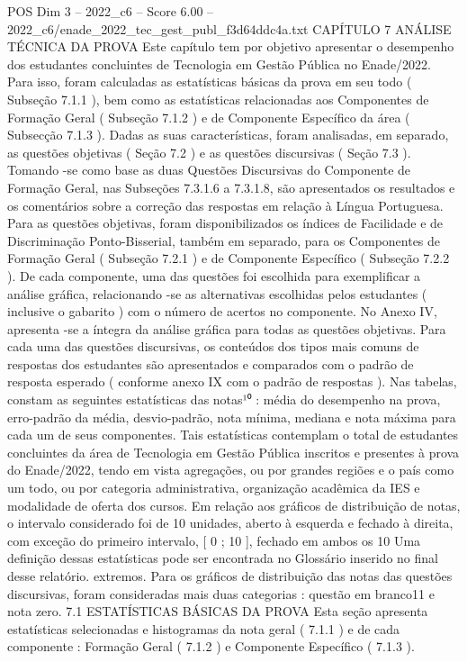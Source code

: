 \begin{textsample}{POS Dim 3 – 2022\_c6 – Score 6.00 – 2022\_c6/enade\_2022\_tec\_gest\_publ\_f3d64ddc4a.txt}  \label{ex:f3_pos_029}
CAPÍTULO 7 ANÁLISE TÉCNICA DA PROVA Este capítulo tem por objetivo apresentar o desempenho dos estudantes concluintes de Tecnologia em Gestão Pública no Enade/2022.
Para isso, foram calculadas as estatísticas básicas da prova em seu todo ( Subseção 7.1.1 ), bem como as estatísticas relacionadas aos Componentes de Formação Geral ( Subseção 7.1.2 ) e de Componente Específico da área ( Subsecção 7.1.3 ).
Dadas as suas características, foram analisadas, em separado, as questões objetivas ( Seção 7.2 ) e as questões discursivas ( Seção 7.3 ).
Tomando -se como base as duas Questões Discursivas do Componente de Formação Geral, nas Subseções 7.3.1.6 a 7.3.1.8, são apresentados os resultados e os comentários sobre a correção das respostas em relação à Língua Portuguesa.
Para as questões objetivas, foram disponibilizados os índices de Facilidade e de Discriminação Ponto-Bisserial, também em separado, para os Componentes de Formação Geral ( Subseção 7.2.1 ) e de Componente Específico ( Subseção 7.2.2 ).
De cada componente, uma das questões foi escolhida para exemplificar a análise gráfica, relacionando -se as alternativas escolhidas pelos estudantes ( inclusive o gabarito ) com o número de acertos no componente.
No Anexo IV, apresenta -se a íntegra da análise gráfica para todas as questões objetivas.
Para cada uma das questões discursivas, os conteúdos dos tipos mais comuns de respostas dos estudantes são apresentados e comparados com o padrão de resposta esperado ( conforme anexo IX com o padrão de respostas ).
Nas tabelas, constam as seguintes estatísticas das notas¹⁰ : média do desempenho na prova, erro-padrão da média, desvio-padrão, nota mínima, mediana e nota máxima para cada um de seus componentes.
Tais estatísticas contemplam o total de estudantes concluintes da área de Tecnologia em Gestão Pública inscritos e presentes à prova do Enade/2022, tendo em vista agregações, ou por grandes regiões e o país como um todo, ou por categoria administrativa, organização acadêmica da IES e modalidade de oferta dos cursos.
Em relação aos gráficos de distribuição de notas, o intervalo considerado foi de 10 unidades, aberto à esquerda e fechado à direita, com exceção do primeiro intervalo, [ 0 ; 10 ], fechado em ambos os 10 Uma definição dessas estatísticas pode ser encontrada no Glossário inserido no final desse relatório. extremos.
Para os gráficos de distribuição das notas das questões discursivas, foram consideradas mais duas categorias : questão em branco11 e nota zero. 7.1 ESTATÍSTICAS BÁSICAS DA PROVA Esta seção apresenta estatísticas selecionadas e histogramas da nota geral ( 7.1.1 ) e de cada componente : Formação Geral ( 7.1.2 ) e Componente Específico ( 7.1.3 ).

\end{textsample}
